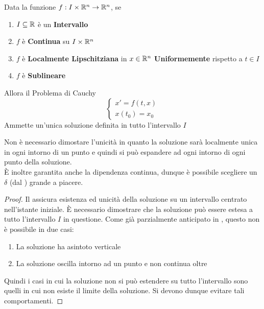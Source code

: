 \begin{theorem}
	\label{teo:cau_globale}
	Data la funzione $f: I \times \mathbb{R}^n \to \mathbb{R}^n$, se
	\begin{enumerate}
		\item $I \subseteq \mathbb{R}$ è un \textbf{Intervallo}
		\item $f$ è \textbf{Continua} su $I\times \mathbb{R}^n$
		\item $f$ è \textbf{Localmente Lipschitziana} in $x  \in \mathbb{R}^n$ \textbf{Uniformemente} rispetto a $t \in I$
		\item $f$ è \textbf{Sublineare}
	\end{enumerate}
	Allora il Problema di Cauchy
	\begin{equation}
		\label{eq:cau_glob_thesis_prob}
		\begin{cases}
			x' = f(t,x)\\
			x(t_0) = x_0
		\end{cases}
	\end{equation}
	Ammette un'unica soluzione definita in tutto l'intervallo $I$
	\begin{note}
		Non è necessario dimostare l'unicità in quanto la soluzione sarà localmente unica in ogni intorno di un punto e quindi si può espandere ad ogni intorno di ogni punto della soluzione.\\
		È inoltre garantita anche la dipendenza continua, dunque è possibile scegliere un $\delta$ (dal ) grande a piacere.
	\end{note}
	\begin{proof}
		Il  assicura esistenza ed unicità della soluzione su un intervallo centrato nell'istante iniziale. È necessario dimostrare che la soluzione può essere estesa a tutto l'intervallo $I$ in questione. Come già parzialmente anticipato in , questo non è possibile in due casi:
		\begin{enumerate}
			\item La soluzione ha asintoto verticale
			\item La soluzione oscilla intorno ad un punto e non continua oltre
		\end{enumerate}
		Quindi i casi in cui la soluzione non si può estendere su tutto l'intervallo sono quelli in cui non esiste il limite della soluzione. Si devono dunque evitare tali comportamenti.


\end{proof}
\end{theorem}
